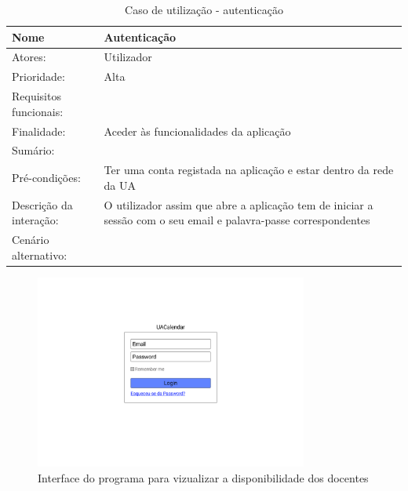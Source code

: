 \documentclass[11pt, twoside]{report}
\begin{document}
	\begin{table}[H]
		\caption{Caso de utilização - autenticação}
		\begin{center}	
			\begin{tabularx}{\textwidth}{|l|X|}
				\hline
				\textbf{Nome }	& \textbf{Autenticação} \\
				\hline
				Atores: & Utilizador \\
				\hline
				Prioridade: & Alta \\
				\hline
				Requisitos funcionais:&  \\
				\hline
				Finalidade: & Aceder às funcionalidades da aplicação\\
				\hline
				Sumário: &  \\
				\hline
				Pré-condições: & Ter uma conta registada na aplicação e estar dentro da rede da UA\\
				\hline
				Descrição da interação: &  O utilizador assim que abre a aplicação tem de iniciar a sessão com o seu email e palavra-passe correspondentes\\
				\hline
				Cenário alternativo:&\\
				\hline
			\end{tabularx}
		\end{center}
	\end{table}

	\begin{figure}[H] 
		\centering 
		\includegraphics[width=0.8\textwidth,height=0.8\textheight,keepaspectratio]{image/prototipowireframes/autenticacao}
		\caption{Interface do programa para vizualizar a disponibilidade dos docentes}
		\label{usecaseautenticacao}
	\end{figure}
\end{document}
